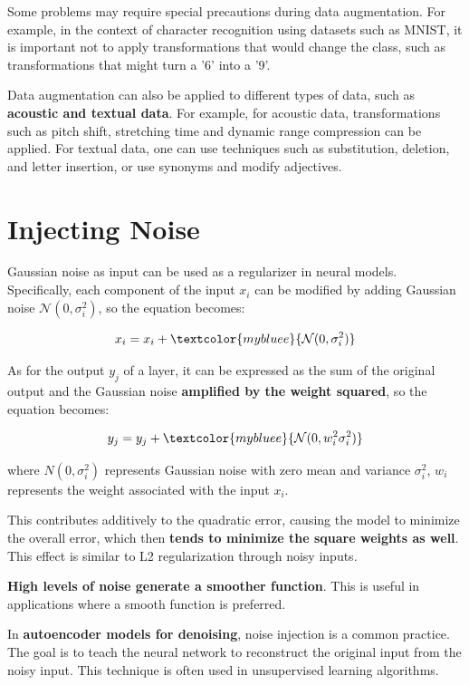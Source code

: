 Some problems may require special precautions during data augmentation. For example, in the context of character recognition using datasets such as MNIST, it is important not to apply transformations that would change the class, such as transformations that might turn a '6' into a '9'.
    
Data augmentation can also be applied to different types of data, such as \textbf{acoustic and textual data}. For example, for acoustic data, transformations such as pitch shift, stretching time and dynamic range compression can be applied. For textual data, one can use techniques such as substitution, deletion, and letter insertion, or use synonyms and modify adjectives.

\section{Injecting Noise}

Gaussian noise as input can be used as a regularizer in neural models. Specifically, each component of the input \( x_i \) can be modified by adding Gaussian noise \( \mathcal{N}(0, \sigma_i^2) \), so the equation becomes:

$$ x_i = x_i + \textcolor{mybluee}{\mathcal{N}(0, \sigma_i^2)} $$

As for the output \( y_j \) of a layer, it can be expressed as the sum of the original output and the Gaussian noise \textbf{amplified by the weight squared}, so the equation becomes:

$$ y_j = y_j + \textcolor{mybluee}{\mathcal{N}(0, w_i^2 \sigma_i^2)} $$

where \( N(0, \sigma_i^2) \) represents Gaussian noise with zero mean and variance \( \sigma_i^2 \), \( w_i \) represents the weight associated with the input \( x_i \).

This contributes additively to the quadratic error, causing the model to minimize the overall error, which then \textbf{tends to minimize the square weights as well}. This effect is similar to L2 regularization through noisy inputs. 

\textbf{High levels of noise generate a smoother function}. This is useful in applications where a smooth function is preferred.

In \textbf{autoencoder models for denoising}, noise injection is a common practice. The goal is to teach the neural network to reconstruct the original input from the noisy input. This technique is often used in unsupervised learning algorithms.

